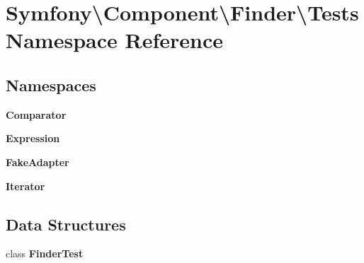\section{Symfony\textbackslash{}Component\textbackslash{}Finder\textbackslash{}Tests Namespace Reference}
\label{namespace_symfony_1_1_component_1_1_finder_1_1_tests}
\subsection*{Namespaces}
\begin{DoxyCompactItemize}
\item 
 {\bf Comparator}
\item 
 {\bf Expression}
\item 
 {\bf Fake\+Adapter}
\item 
 {\bf Iterator}
\end{DoxyCompactItemize}
\subsection*{Data Structures}
\begin{DoxyCompactItemize}
\item 
class {\bf Finder\+Test}
\end{DoxyCompactItemize}
